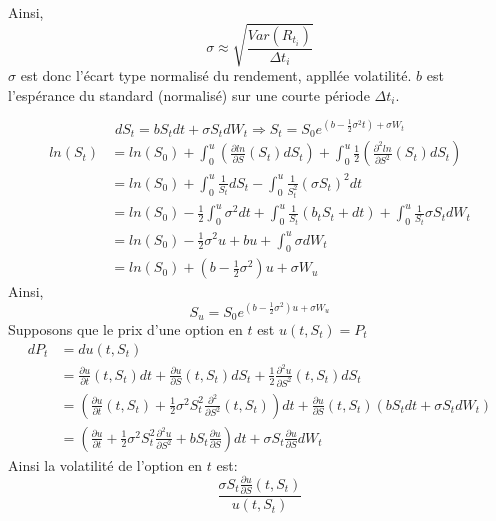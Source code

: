 \documentclass{article}
\theoremstyle{plain}
\theoremstyle{definition}
\begin{document}
Ainsi,
\begin{equation}
\sigma\approx\sqrt{\frac{Var(R_{t_i})}{\Delta t_i}}
\end{equation}
$\sigma$ est donc l'\'ecart type normalis\'e du rendement, appll\'ee volatilit\'e.
$b$ est l'esp\'erance du standard (normalis\'e) sur une courte p\'eriode $\Delta t_i$.

\begin{equation}
dS_t=bS_tdt+\sigma S_t dW_t \Rightarrow S_t=S_0 e^{(b-\frac{1}{2}\sigma^2 t)+\sigma W_t}
\end{equation}
\begin{equation}
\begin{split}
ln(S_t)&=ln(S_0)+\int_0^u (\frac{\partial ln}{\partial S}(S_t) dS_t)+\int_0^u \frac{1}{2}(\frac{\partial^2 ln}{\partial S^2}(S_t)dS_t)\\
&=ln(S_0)+\int_0^u\frac{1}{S_t} dS_t -\int_0^u \frac{1}{S_t^2}(\sigma S_t)^2 dt\\
&=ln(S_0)-\frac{1}{2}\int_0^u\sigma^2 dt + \int_0^u \frac{1}{S_t} (b_t S_t+dt)+\int_0^u \frac{1}{S_t}\sigma S_t dW_t\\
&=ln(S_0)-\frac{1}{2}\sigma^2 u+b u+\int_0^u\sigma d W_t\\
&=ln(S_0)+(b-\frac{1}{2}\sigma^2)u+\sigma W_u
\end{split}
\end{equation}
Ainsi,
\begin{equation}
S_u=S_0e^{(b-\frac{1}{2}\sigma^2)u+\sigma W_u}
\end{equation}
Supposons que le prix d'une option en $t$ est $u(t,S_t)=P_t$
\begin{equation}
\begin{split}
dP_t&=du(t,S_t)\\
&=\frac{\partial u}{\partial t}(t, S_t)dt+\frac{\partial u}{\partial S}(t,S_t)dS_t+\frac{1}{2}\frac{\partial^2 u}{\partial S^2}(t,S_t)dS_t\\
&=(\frac{\partial u}{\partial t}(t,S_t)+\frac{1}{2}\sigma^2S_t^2\frac{\partial^2}{\partial S^2}(t, S_t))dt+\frac{\partial u}{\partial S}(t, S_t)(bS_tdt + \sigma S_tdW_t)\\
&=(\frac{\partial u}{\partial t}+\frac{1}{2}\sigma^2 S_t^2\frac{\partial^2 u}{\partial S^2}+bS_t\frac{\partial u}{\partial S})dt+\sigma S_t\frac{\partial u}{\partial S}dW_t
\end{split}
\end{equation}
Ainsi la volatilit\'e de l'option en $t$ est:
\begin{equation}
\frac{\sigma S_t \frac{\partial u}{\partial S}(t, S_t)}{u(t, S_t)}
\end{equation}
\end{document}
